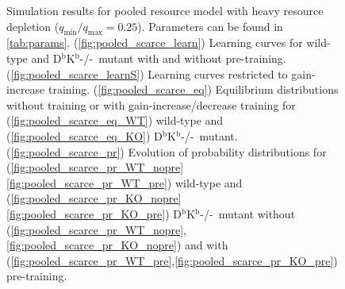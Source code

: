 \documentclass[12pt]{article}
\newcommand{\KO}{D$^\mathrm{b}$K$^\mathrm{b}$-/-}
\newcommand{\lmax}{_{\text{max}}}
\newcommand{\lmin}{_{\text{min}}}
\begin{document}
\begin{figure}
 \begin{center}
 \begin{myenuma}
  \item{}\label{fig:pooled_scarce_learn}
  \item{}\label{fig:pooled_scarce_learnS}
  \item\label{fig:pooled_scarce_eq}\begin{myenumi}
                    \item{}\label{fig:pooled_scarce_eq_WT}
                    \item{}\label{fig:pooled_scarce_eq_KO}
                  \end{myenumi}
  \item\label{fig:pooled_scarce_pr}\begin{myenumi}
                    \item{}\label{fig:pooled_scarce_pr_WT_nopre}
                    \item{}\label{fig:pooled_scarce_pr_WT_pre}
                    \item{}\label{fig:pooled_scarce_pr_KO_nopre}
                    \item{}\label{fig:pooled_scarce_pr_KO_pre}
                  \end{myenumi}
 \end{myenuma}
 \end{center}
  \caption{Simulation results for pooled resource model with heavy resource depletion ($q\lmin/q\lmax=0.25$).
  Parameters can be found in \autoref{tab:params}.
  (\ref{fig:pooled_scarce_learn}) Learning curves for wild-type and \KO\ mutant with and without pre-training.
  (\ref{fig:pooled_scarce_learnS}) Learning curves restricted to gain-increase training.
  (\ref{fig:pooled_scarce_eq}) Equilibrium distributions without training or with gain-increase/decrease training for (\ref{fig:pooled_scarce_eq_WT}) wild-type and (\ref{fig:pooled_scarce_eq_KO}) \KO\ mutant.
  (\ref{fig:pooled_scarce_pr}) Evolution of probability distributions for (\ref{fig:pooled_scarce_pr_WT_nopre}\ref{fig:pooled_scarce_pr_WT_pre}) wild-type and  (\ref{fig:pooled_scarce_pr_KO_nopre}\ref{fig:pooled_scarce_pr_KO_pre}) \KO\ mutant without (\ref{fig:pooled_scarce_pr_WT_nopre},\ref{fig:pooled_scarce_pr_KO_nopre}) and with (\ref{fig:pooled_scarce_pr_WT_pre},\ref{fig:pooled_scarce_pr_KO_pre}) pre-training. } \label{fig:pooled_scarce}
\end{figure}
\end{document}
